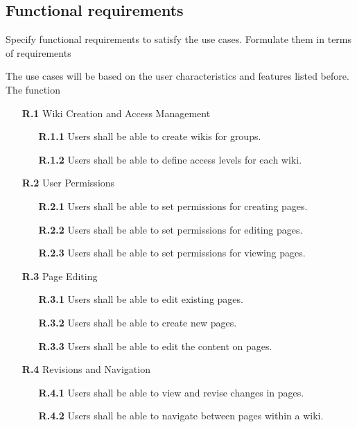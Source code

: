 \documentclass{article}
\begin{document}
\subsection{Functional requirements}
Specify functional requirements to satisfy the use cases. Formulate them in terms of requirements

The use cases will be based on the user characteristics and features listed before. The function

\begin{itemize}
    \item[\textbf{R.1}] Wiki Creation and Access Management
    \begin{itemize}
        \item[\textbf{R.1.1}] Users shall be able to create wikis for groups.
        \item[\textbf{R.1.2}] Users shall be able to define access levels for each wiki.
    \end{itemize}
    
    \item[\textbf{R.2}] User Permissions
    \begin{itemize}
        \item[\textbf{R.2.1}] Users shall be able to set permissions for creating pages.
        \item[\textbf{R.2.2}] Users shall be able to set permissions for editing pages.
        \item[\textbf{R.2.3}] Users shall be able to set permissions for viewing pages.
    \end{itemize}
    
    \item[\textbf{R.3}] Page Editing
    \begin{itemize}
        \item[\textbf{R.3.1}] Users shall be able to edit existing pages.
        \item[\textbf{R.3.2}] Users shall be able to create new pages.
        \item[\textbf{R.3.3}] Users shall be able to edit the content on pages.
    \end{itemize}
    
    \item[\textbf{R.4}] Revisions and Navigation
    \begin{itemize}
        \item[\textbf{R.4.1}] Users shall be able to view and revise changes in pages.
        \item[\textbf{R.4.2}] Users shall be able to navigate between pages within a wiki.
    \end{itemize}
    

\end{itemize}
\end{document}
